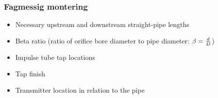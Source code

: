 \documentclass[aspectratio=169,xcolor=dvipsnames]{beamer}
\begin{document}
%
%
%
%
%
%
%
%
%
%
%
\begin{frame}
	\frametitle{Fagmessig montering}

\begin{itemize}
\item Necessary upstream and downstream straight-pipe lengths
\item Beta ratio (ratio of orifice bore diameter to pipe diameter: $\beta = {d \over D}$)
\item Impulse tube tap locations
\item Tap finish
\item Transmitter location in relation to the pipe
\end{itemize}
\end{frame}
\end{document}
